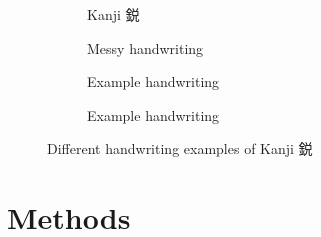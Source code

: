 \documentclass{article}
\begin{document}
\begin{CJK*}{UTF8}{min}
\begin{figure}
\begin{subfigure}[t]{0.2\textwidth}
        \caption{Kanji 鋭}
        \label{fig:ideal_sample}
    \end{subfigure}
    \begin{subfigure}[t]{0.2\textwidth}
        \caption{Messy handwriting}
        \label{fig:sample-a}
    \end{subfigure}
    \begin{subfigure}[t]{0.2\textwidth}
        \caption{Example handwriting}
        \label{fig:sample-b}
    \end{subfigure}
    \begin{subfigure}[t]{0.2\textwidth}
        \caption{Example handwriting}
        \label{fig:sample-c}
    \end{subfigure}
    \caption{Different handwriting examples of Kanji 鋭}
    \label{fig:handwriting}
\end{figure}

\section{Methods}

\end{CJK*}
\end{document}
